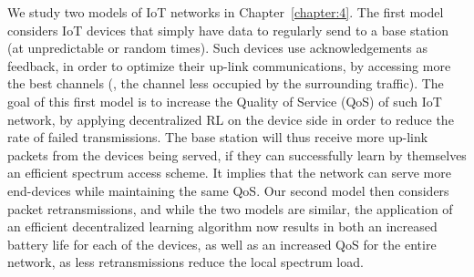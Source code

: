 %
We study two models of IoT networks in Chapter~\ref{chapter:4}.
The first model considers IoT devices that simply have data to regularly send to a base station (at unpredictable or random times).
Such devices use acknowledgements as feedback, in order to optimize their up-link communications, by accessing more the best channels (\ie, the channel less occupied by the surrounding traffic).
The goal of this first model is to increase the Quality of Service (QoS) of such IoT network, by applying decentralized RL on the device side in order to reduce the rate of failed transmissions.
The base station will thus receive more up-link packets from the devices being served, if they can successfully learn by themselves an efficient spectrum access scheme.
It implies that the network can serve more end-devices while maintaining the same QoS.
%
Our second model then considers packet retransmissions, and while the two models are similar, the application of an efficient decentralized learning algorithm now results in both an increased battery life for each of the devices, as well as an increased QoS for the entire network, as less retransmissions reduce the local spectrum load.

